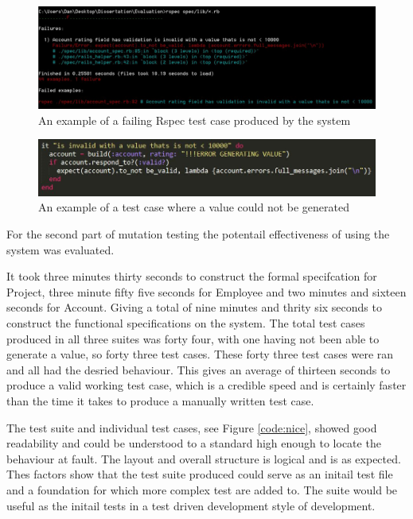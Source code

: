\documentclass[a4paper,12pt]{article}
\begin{document}
\begin{figure}
\includegraphics[width=\linewidth]{screenshots/rspecfail}
\caption{An example of a failing Rspec test case produced by the system}
\label{fig:rspecfail}
\end{figure}

\begin{figure}
\includegraphics[width=\linewidth]{screenshots/rspecfailcode}
\caption{An example of a test case where a value could not be generated}
\label{fig:rspecfailcode}
\end{figure}

\par For the second part of mutation testing the potentail effectiveness of using the system was evaluated.
\par It took three minutes thirty seconds to construct the formal specifcation for Project, three minute fifty five seconds for Employee and two minutes and sixteen seconds for Account. Giving a total of nine minutes and thrity six seconds to construct the functional specifications on the system. The total test cases produced in all three suites was forty four, with one having not been able to generate a value, so forty three test cases. These forty three test cases  were ran and all had the desried behaviour. This gives an average of thirteen seconds to produce a valid working test case, which is a credible speed and is certainly faster than the time it takes to produce a manually written test case.
\par The test suite and individual test cases, see Figure \ref{code:nice}, showed good readability and could be understood to a standard high enough to locate the behaviour at fault. The layout and overall structure is logical and is as expected. Thes factors show that the test suite produced could serve as an initail test file and a foundation for which more complex test are added to. The suite would be useful as the initail tests in a test driven development style of development.
\end{document}
